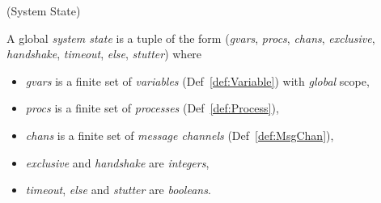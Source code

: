 \begin{definition}{}{}
\label{def:SysState}
(System State)

A global \textit{system state} is a tuple of the form  (\textit{gvars}, \textit{procs}, \textit{chans}, \textit{exclusive}, \textit{handshake}, \textit{timeout}, \textit{else}, \textit{stutter}) where
\begin{itemize}
\item[] \textit{gvars} is a finite set of \textit{variables} (Def~\ref{def:Variable}) with \textit{global} scope,
\item[] \textit{procs} is a finite set of \textit{processes} (Def~\ref{def:Process}),
\item[] \textit{chans} is a finite set of \textit{message channels} (Def~\ref{def:MsgChan}),
\item[] \textit{exclusive} and \textit{handshake} are \textit{integers},
\item[] \textit{timeout}, \textit{else} and \textit{stutter} are \textit{booleans}.
\end{itemize}
\end{definition}